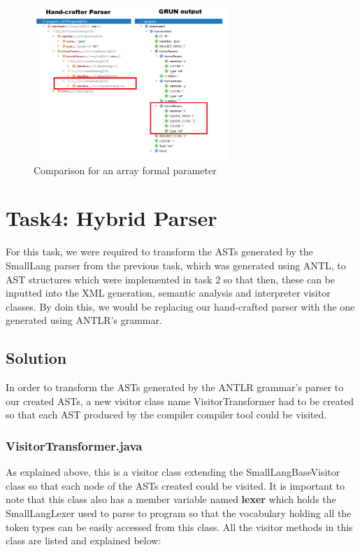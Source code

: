 \documentclass{article}
\begin{document}
\begin{enumerate}
						\begin{figure}[H]
					\centering
			 			\includegraphics[width=0.65\textwidth]{comparearrayfp.png}
			  			\caption{Comparison for an array formal parameter}
			  			\label{fig:comparearrayfp}
					\end{figure}
					
					\end{enumerate}
					
					
					\section{Task4: Hybrid Parser}
					
					For this task, we were required to transform the ASTs generated by the SmallLang parser from the previous task, which was generated using ANTL, to AST structures which were implemented in task 2 so that then, these can be inputted into the XML generation, semantic analysis and interpreter visitor classes. By doin this, we would be replacing our hand-crafted parser with the one generated using ANTLR's grammar.
					
				\subsection{Solution}
				
				In order to transform the ASTs generated by the ANTLR grammar's parser to our created ASTs, a new visitor class name VisitorTransformer had to be created so that each AST produced by the compiler compiler tool could be visited.
				
				\subsubsection{VisitorTransformer.java}
				
				As explained above, this is a visitor class extending the SmallLangBaseVisitor class so that each node of the ASTs created could be visited. It is important to note that this class also has a member variable named \textbf{lexer} which holds the SmallLangLexer used to parse to program so that the vocabulary holding all the token types can be easily accessed from this class. All the visitor methods in this class are listed and explained below:
				
\end{document}
